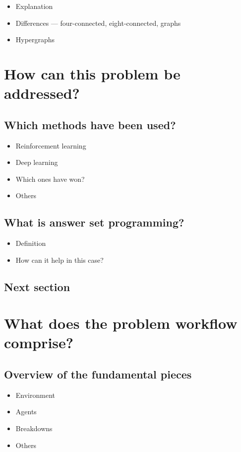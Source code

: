 \documentclass[11pt]{article}
\begin{document}
\begin{itemize}
  \item Explanation
  \item Differences — four-connected, eight-connected, graphs
  \item Hypergraphs
\end{itemize}

\pagebreak
\section{How can this problem be addressed?}
\subsection{Which methods have been used?}
\begin{itemize}
  \item Reinforcement learning
  \item Deep learning
  \item Which ones have won?
  \item Others
\end{itemize}

\subsection{What is answer set programming?}
\begin{itemize}
  \item Definition
  \item How can it help in this case?
\end{itemize}

\subsection{Next section}

\pagebreak
\section{What does the problem workflow comprise?}
\subsection{Overview of the fundamental pieces}
\begin{itemize}
  \item Environment
  \item Agents
  \item Breakdowns
  \item Others
\end{itemize} 
\end{document}
